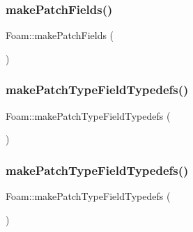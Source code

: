 \mbox{\label{namespaceFoam_a3660424af92ae72a8224db47ee90cf13}} 
\subsubsection{\texorpdfstring{make\+Patch\+Fields()}{makePatchFields()}\hspace{0.1cm}{\footnotesize\ttfamily [2/2]}}
{\footnotesize\ttfamily Foam\+::make\+Patch\+Fields (\begin{DoxyParamCaption}\item[{coupled\+Uniform\+External\+Value}]{ }\end{DoxyParamCaption})}

\mbox{\label{namespaceFoam_a419d9f64b597c66590f5353f539e2f10}} 
\subsubsection{\texorpdfstring{make\+Patch\+Type\+Field\+Typedefs()}{makePatchTypeFieldTypedefs()}\hspace{0.1cm}{\footnotesize\ttfamily [2/3]}}
{\footnotesize\ttfamily Foam\+::make\+Patch\+Type\+Field\+Typedefs (\begin{DoxyParamCaption}\item[{coupled\+Uniform\+External\+Value}]{ }\end{DoxyParamCaption})}

\mbox{\label{namespaceFoam_a4c56280e0f32a8f7b92a6ba0776090da}} 
\subsubsection{\texorpdfstring{make\+Patch\+Type\+Field\+Typedefs()}{makePatchTypeFieldTypedefs()}\hspace{0.1cm}{\footnotesize\ttfamily [3/3]}}
{\footnotesize\ttfamily Foam\+::make\+Patch\+Type\+Field\+Typedefs (\begin{DoxyParamCaption}\item[{uniform}]{ }\end{DoxyParamCaption})}

